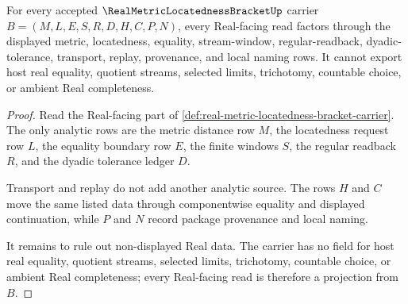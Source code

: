\begin{theorem}
\label{thm:real-metric-locatedness-bracket-non-escape}
For every accepted $\RealMetricLocatednessBracketUp$ carrier $B=(M,L,E,S,R,D,H,C,P,N)$, every Real-facing read factors through the displayed metric, locatedness, equality, stream-window, regular-readback, dyadic-tolerance, transport, replay, provenance, and local naming rows. It cannot export host real equality, quotient streams, selected limits, trichotomy, countable choice, or ambient Real completeness.
\end{theorem}
\begin{proof}
Read the Real-facing part of \autoref{def:real-metric-locatedness-bracket-carrier}. The only analytic rows are the metric distance row $M$, the locatedness request row $L$, the equality boundary row $E$, the finite windows $S$, the regular readback $R$, and the dyadic tolerance ledger $D$.

Transport and replay do not add another analytic source. The rows $H$ and $C$ move the same listed data through componentwise equality and displayed continuation, while $P$ and $N$ record package provenance and local naming.

It remains to rule out non-displayed Real data. The carrier has no field for host real equality, quotient streams, selected limits, trichotomy, countable choice, or ambient Real completeness; every Real-facing read is therefore a projection from $B$.
\end{proof}


\begin{closurestatus}{\RealMetricLocatednessBracketUp}
  \theoryclosure{\seedClosure}
  \formalstatus{\unformalizedV}
\end{closurestatus}
